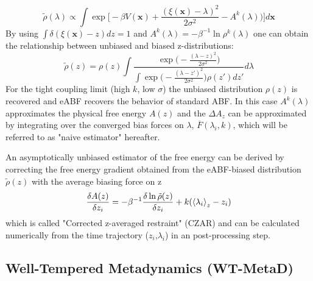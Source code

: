 \begin{equation}
  \tilde{\rho}(\lambda) \propto \int \exp \biggl[-\beta V(\textbf{x})+\frac{(\xi(\textbf{x})-\lambda)^2}{2\sigma^2} - A^{k}(\lambda) \biggr) \biggr] d\textbf{x}
\end{equation}
By using $\int \delta(\xi(\textbf{x})-z)dz=1$ and $A^k(\lambda)=-\beta^{-1}\ln\rho^k(\lambda)$ one can obtain the relationship between unbiased and biased z-distributions:
\begin{equation}
  \tilde{\rho}(z) =  \rho(z) \int \frac{\exp \bigl(-\frac{(\lambda-z)^2}{2\sigma^2}\bigr)}
  {\int \exp\bigl(-\frac{(\lambda-z')^2}{2\sigma^2}\bigr)\rho(z')dz'} d\lambda
\end{equation}
For the tight coupling limit (high $k$, low $\sigma$) the unbiased distribution $\rho(z)$ is recovered and eABF recovers the behavior of standard ABF. In this case $A^k(\lambda)$  approximates the physical free energy $A(z)$ and the $\Delta A_{z}$ can be approximated by integrating over the converged bias forces on $\lambda$, $\overline{F}(\lambda_{i}, k)$, which will be referred to as "naive estimator" hereafter.

An asymptotically unbiased estimator of the free energy can be derived by correcting the free energy gradient obtained from the eABF-biased distribution $\tilde{\rho}(z)$ with the average biasing force on z
\begin{equation}
  \frac{\delta A(z)}{\delta z_i} = -\beta^{-1}\frac{\delta \ln \tilde{\rho}(z)}{\delta z_i} + k(\braket{\lambda_i}_{z}-z_{i})
\end{equation}
which is called "Corrected z-averaged restraint" (CZAR) and can be calculated numerically from the time trajectory ($z_i$,$\lambda_i$) in an post-processing step.\autocite{lesage2017smoothed}

\subsection{Well-Tempered Metadynamics (WT-MetaD)}
\label{sec:metaD}

